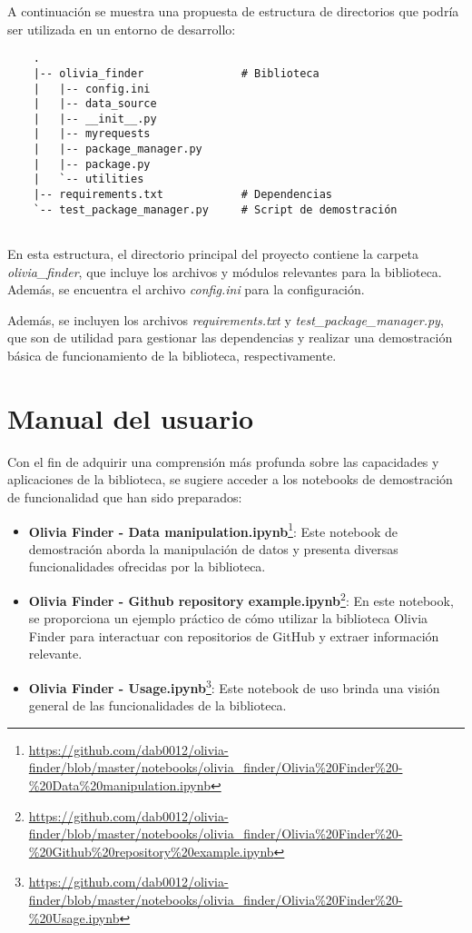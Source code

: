 A continuación se muestra una propuesta de estructura de directorios que podría ser utilizada en un entorno de desarrollo:

\begin{verbatim}
    .
    |-- olivia_finder               # Biblioteca
    |   |-- config.ini
    |   |-- data_source
    |   |-- __init__.py
    |   |-- myrequests
    |   |-- package_manager.py
    |   |-- package.py
    |   `-- utilities
    |-- requirements.txt            # Dependencias
    `-- test_package_manager.py     # Script de demostración
    
\end{verbatim}

En esta estructura, el directorio principal del proyecto contiene la carpeta \textit{olivia\_finder}, que incluye
los archivos y módulos relevantes para la biblioteca. Además, se encuentra el archivo \textit{config.ini} para la configuración.

Además, se incluyen los archivos \textit{requirements.txt} y \textit{test\_package\_manager.py}, que son de utilidad
para gestionar las dependencias y realizar una demostración básica de funcionamiento de la biblioteca, respectivamente.

\section{Manual del usuario}

Con el fin de adquirir una comprensión más profunda sobre las capacidades y aplicaciones de la biblioteca,
se sugiere acceder a los notebooks de demostración de funcionalidad que han sido preparados:


\begin{itemize}
    \item \textbf{Olivia Finder - Data manipulation.ipynb}\footnote{\url{https://github.com/dab0012/olivia-finder/blob/master/notebooks/olivia_finder/Olivia\%20Finder\%20-\%20Data\%20manipulation.ipynb}}:
          Este notebook de demostración aborda la manipulación de datos y presenta diversas funcionalidades ofrecidas por la biblioteca.
    \item \textbf{Olivia Finder - Github repository example.ipynb}\footnote{\url{https://github.com/dab0012/olivia-finder/blob/master/notebooks/olivia_finder/Olivia\%20Finder\%20-\%20Github\%20repository\%20example.ipynb}}:
          En este notebook, se proporciona un ejemplo práctico de cómo utilizar la biblioteca Olivia Finder para interactuar con repositorios de GitHub y extraer información relevante.
    \item \textbf{Olivia Finder - Usage.ipynb}\footnote{\url{https://github.com/dab0012/olivia-finder/blob/master/notebooks/olivia_finder/Olivia\%20Finder\%20-\%20Usage.ipynb}}:
          Este notebook de uso brinda una visión general de las funcionalidades de la biblioteca.
\end{itemize}

